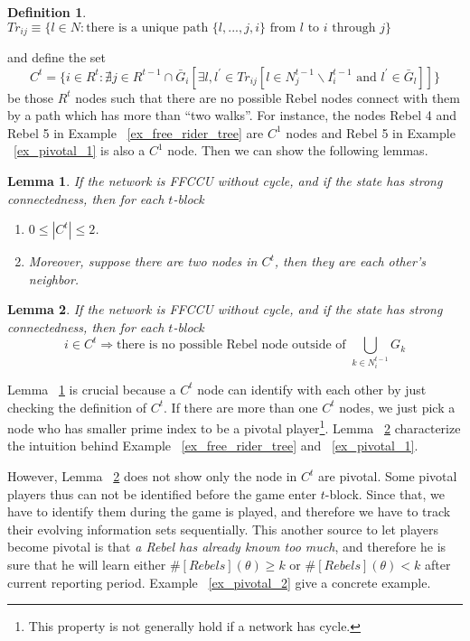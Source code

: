 \documentclass[12pt,letter]{article}
\newtheorem{lemma}{Lemma}[section]
\newtheorem{definition}{Definition}[section]
\theoremstyle{definition}
\theoremstyle{remark}
\theoremstyle{claim}
\begin{document}
\begin{definition}
$Tr_{ij}\equiv \{l\in N:\text{there is a unique path $\{l,...,j,i\}$ from $l$ to $i$ through $j$}\}$
\end{definition}
and define the set
\[C^t=\{i\in R^t:\nexists j\in R^{t-1}\cap \bar{G}_i[\exists l,l^{'}\in Tr_{ij}[l\in N^{t-1}_j\backslash I^{t-1}_i \text{ and } l^{'}\in \bar{G}_l]]\}\]
be those $R^t$ nodes such that there are no possible Rebel nodes connect with them by a path which has more than ``two walks''. For instance, the nodes Rebel 4 and Rebel 5 in Example ~\ref{ex_free_rider_tree} are $C^1$ nodes and Rebel 5 in Example ~\ref{ex_pivotal_1} is also a $C^1$ node. Then we can show the following lemmas. 

\begin{lemma}
\label{lemma_at_most_two_nodes}
If the network is FFCCU without cycle, and  if the state has strong connectedness, then for each $t$-block
\begin{enumerate}
\item $0\leq |C^t| \leq 2$.
\item Moreover, suppose there are two nodes in $C^t$, then they are each other's neighbor.
\end{enumerate}
\end{lemma}


\begin{lemma}
\label{lemma_no_node_outside}
If the network is FFCCU without cycle, and if the state has strong connectedness, then for each $t$-block
\[i\in C^t \Rightarrow \text{there is no possible Rebel node outside of }\bigcup_{k\in N^{t-1}_i}G_k\]
\end{lemma}

Lemma ~\ref{lemma_at_most_two_nodes} is crucial because a $C^t$ node can identify with each other by just checking the definition of $C^t$. If there are more than one $C^t$ nodes, we just pick a node who has smaller prime index to be a pivotal player\footnote{This property is not generally hold if a network has cycle.}. Lemma ~\ref{lemma_no_node_outside} characterize the intuition behind Example ~\ref{ex_free_rider_tree} and ~\ref{ex_pivotal_1}.

However, Lemma ~\ref{lemma_no_node_outside} does not show only the node in $C^t$ are pivotal. Some pivotal players thus can not be identified before the game enter $t$-block. Since that, we have to identify them during the game is played, and therefore we have to track their evolving information sets sequentially. This another source to let players become pivotal is that \textit{a Rebel has already known too much}, and therefore he is sure that he will learn {either $\#[Rebels](\theta)\geq k$ or $\#[Rebels](\theta)< k$} after current reporting period. Example ~\ref{ex_pivotal_2} give a concrete example.
\end{document}
